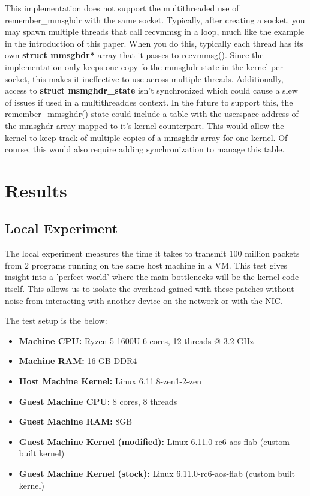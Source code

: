 \documentclass[11pt]{article}
\begin{document}
This implementation does not support the multithreaded use of remember\_mmsghdr with the same socket. Typically, after creating a socket, you may 
spawn multiple threads that call recvmmsg in a loop, much like the example in the introduction of this paper. When you do this, typically each thread has 
its own \textbf{struct mmsghdr*} array that it passes to recvmmsg(). Since the implementation only keeps one copy fo the mmsghdr state in the 
kernel per socket, this makes it ineffective to use across multiple threads. Additionally, access to \textbf{struct msmghdr\_state} isn't synchronized 
which could cause a slew of issues if used in a multithreaddes context. In the future to support this, the remember\_mmsghdr() state could 
include a table with the userspace address of the mmsghdr array mapped to it's kernel counterpart. This would allow the kernel to keep track of 
multiple copies of a mmsghdr array for one kernel. Of course, this would also require adding synchronization to manage this table. 

\section{Results}

\subsection{Local Experiment}

The local experiment measures the time it takes to transmit 100 million packets from 2 programs running on the same host machine in a VM. This test 
gives insight into a 'perfect-world' where the main bottlenecks will be the kernel code itself. This allows us to isolate the overhead gained with 
these patches without noise from interacting with another device on the network or with the NIC.

The test setup is the below:

\begin{itemize}
    \item \textbf{Machine CPU:} Ryzen 5 1600U 6 cores, 12 threads @ 3.2 GHz
    \item \textbf{Machine RAM:} 16 GB DDR4
    \item \textbf{Host Machine Kernel:} Linux 6.11.8-zen1-2-zen 
    \item \textbf{Guest Machine CPU:} 8 cores, 8 threads
    \item \textbf{Guest Machine RAM:} 8GB 
    \item \textbf{Guest Machine Kernel (modified):} Linux 6.11.0-rc6-aos-flab (custom built kernel)
    \item \textbf{Guest Machine Kernel (stock):} Linux 6.11.0-rc6-aos-flab (custom built kernel)
\end{itemize}
\end{document}
